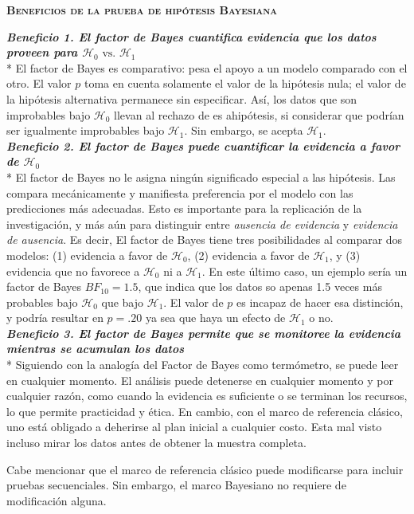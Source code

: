\documentclass[a4paper,12pt]{article}
\begin{document}
{\scshape\bfseries Beneficios de la prueba de hipótesis Bayesiana}

{\slshape\bfseries Beneficio 1. El factor de Bayes cuantifica evidencia que los datos proveen para $\mathcal H_0 \mbox{ vs. } \mathcal H_1$}\\*
El factor de Bayes es comparativo: pesa el apoyo a un modelo comparado con el otro. El valor $p$ toma en cuenta solamente el valor de la hipótesis nula; el valor de la hipótesis alternativa permanece sin especificar. Así, los datos que son improbables bajo $\mathcal H_0$ llevan al rechazo de es ahipótesis, si considerar que podrían ser igualmente improbables bajo $\mathcal H_1$. Sin embargo, se acepta $\mathcal H_1$.\\

{\slshape\bfseries Beneficio 2. El factor de Bayes puede cuantificar la evidencia a favor de $\mathcal H_0$}\\*
El factor de Bayes no le asigna ningún significado especial a las hipótesis. Las compara mecánicamente y manifiesta preferencia por el modelo con las predicciones más adecuadas. Esto es importante para la replicación de la investigación, y más aún  para distinguir entre {\itshape ausencia de evidencia} y {\itshape evidencia de ausencia}. Es decir, El factor de Bayes tiene tres posibilidades al comparar dos modelos: (1) evidencia a favor de $\mathcal H_0$, (2) evidencia a favor de $\mathcal H_1$, y (3) evidencia que no favorece a $\mathcal H_0$ ni a $\mathcal H_1$. En este último caso, un ejemplo sería un factor de Bayes $BF_{10}=1{.}5$, que indica que los datos so apenas 1.5 veces más probables bajo $\mathcal H_0$ que bajo $\mathcal H_1$. El valor de $p$ es incapaz de hacer esa distinción, y podría resultar en $p={.}20$ ya sea que haya un efecto de $\mathcal H_1$ o no.\\

{\slshape\bfseries Beneficio 3. El factor de Bayes permite que se monitoree la evidencia mientras se acumulan los datos}\\*
Siguiendo con la analogía del Factor de Bayes como termómetro, se puede leer en cualquier momento. El análisis puede detenerse en cualquier momento y por cualquier razón, como cuando la evidencia es suficiente o se terminan los recursos, lo que permite practicidad y ética. En cambio, con el marco de referencia clásico, uno está obligado a deherirse al plan inicial a cualquier costo. Esta mal visto incluso mirar los datos antes de obtener la muestra completa.

Cabe mencionar que el marco de referencia clásico puede modificarse para incluir pruebas secuenciales. Sin embargo, el marco Bayesiano no requiere de modificación alguna.\\
\end{document}
